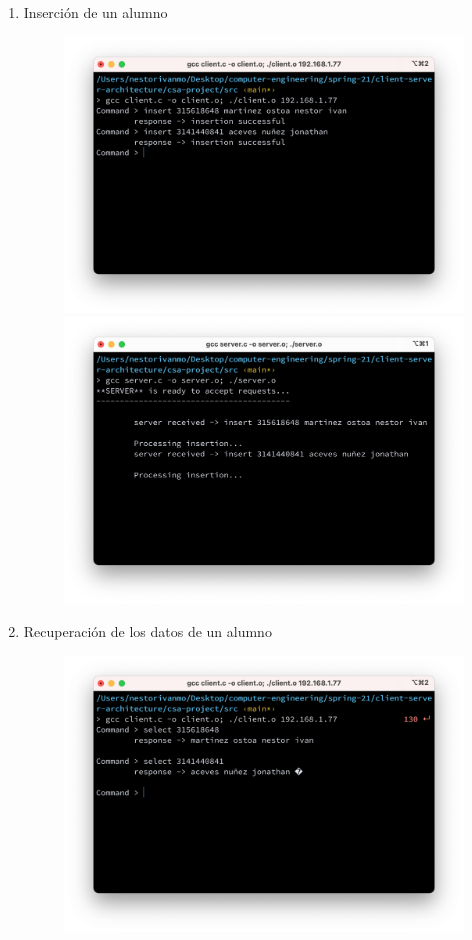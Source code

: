 \documentclass{article}
\begin{document}
\begin{enumerate}
\begin{figure}[H]
		\end{figure}
	\item Inserción de un alumno
		\begin{figure}[H]
		    \centering
		    \includegraphics[scale=0.4]{imgs/client_insertion.png}
		    \includegraphics[scale=0.4]{imgs/server_insertion.png}		    
		\end{figure}
	\item Recuperación de los datos de un alumno
		\begin{figure}[H]
		    \centering
		    \includegraphics[scale=0.4]{imgs/client_selection.png}

\end{figure}
\end{enumerate}
\end{document}
